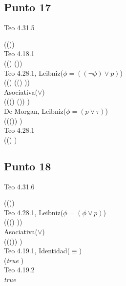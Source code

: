 \documentclass{article}
\begin{document}
\subsection{Punto 17}
\begin{logicenv}{Teo 4.31.5}
    \begin{derivation}
            (\phi \to (\psi \to \tau))\\
        Teo 4.18.1\\
            ((\neg \phi) \lor (\psi \to \tau))\\
        Teo 4.28.1, Leibniz($\phi = ((\neg \phi) \lor p)$)\\
            ((\neg \phi) \lor ((\neg \psi) \lor \tau))\\
        Asociativa($\lor$)\\
            (((\neg \phi) \lor (\neg \psi)) \lor \tau)\\
        De Morgan, Leibniz($\phi = (p \lor \tau)$)\\
            ((\neg (\phi \land \psi)) \lor \tau)\\
        Teo 4.28.1\\
            ((\phi \land \psi) \to \tau)
    \end{derivation}
\end{logicenv}

\subsection{Punto 18}
\begin{logicenv}{Teo 4.31.6}
    \begin{derivation}
        (\phi \lor (\phi \to \psi))\\
    Teo 4.28.1, Leibniz($\phi = (\phi \lor p)$)\\
        (\phi \lor ((\neg \phi) \lor \psi))\\
    Asociativa($\lor$)\\
        ((\phi \lor (\neg \phi)) \lor \psi)\\
    Teo 4.19.1, Identidad($\equiv$)\\
        (\textrm{\textit{true}} \lor \psi)\\
    Teo 4.19.2\\
        \textrm{\textit{true}}
    \end{derivation}
\end{logicenv}
\end{document}
